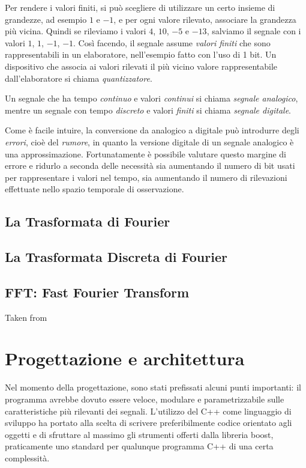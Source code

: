 \documentclass[a4paper,11pt,twoside,openright]{unibo}
\begin{document}
Per rendere i valori finiti, si pu\`o scegliere di utilizzare un certo insieme
di grandezze, ad esempio $1$ e $-1$, e per ogni valore rilevato, associare la
grandezza pi\`u vicina. Quindi se rileviamo i valori $4$, $10$, $-5$ e $-13$,
salviamo il segnale con i valori $1$, $1$, $-1$, $-1$. Cos\`i facendo, il
segnale assume \emph{valori finiti} che sono rappresentabili in un elaboratore,
nell'esempio fatto con l'uso di 1 bit. Un dispositivo che associa ai valori
rilevati il pi\`u vicino valore rappresentabile dall'elaboratore si chiama
\emph{quantizzatore}.

Un segnale che ha tempo \emph{continuo} e valori \emph{continui} si chiama
\emph{segnale analogico}, mentre un segnale con tempo \emph{discreto} e valori
\emph{finiti} si chiama \emph{segnale digitale}.

Come \`e facile intuire, la conversione da analogico a digitale pu\`o introdurre
degli \emph{errori}, cio\`e del \emph{rumore}, in quanto la versione digitale di
un segnale analogico \`e una approssimazione. Fortunatamente \`e possibile
valutare questo margine di errore e ridurlo a seconda delle necessit\`a sia
aumentando il numero di bit usati per rappresentare i valori nel tempo, sia
aumentando il numero di rilevazioni effettuate nello spazio temporale di
osservazione.
\section{La Trasformata di Fourier}
\section{La Trasformata Discreta di Fourier}
\section{FFT: Fast Fourier Transform}
Taken from \cite{bertoni}
\chapter{Progettazione e architettura}
\label{outline}
Nel momento della progettazione, sono stati prefissati alcuni punti importanti:
il programma avrebbe dovuto essere veloce, modulare e parametrizzabile sulle
caratteristiche pi\`u rilevanti dei segnali. L'utilizzo del C++ come linguaggio di
sviluppo ha portato alla scelta di scrivere preferibilmente codice orientato
agli oggetti e di sfruttare al massimo gli strumenti offerti dalla libreria
boost, praticamente uno standard per qualunque programma C++ di una certa
complessit\`a.
\end{document}

